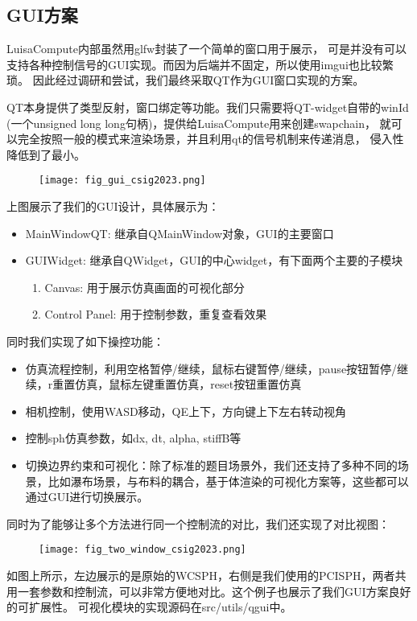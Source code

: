 \subsection{GUI方案}
LuisaCompute内部虽然用glfw封装了一个简单的窗口用于展示，
可是并没有可以支持各种控制信号的GUI实现。而因为后端并不固定，所以使用imgui也比较繁琐。
因此经过调研和尝试，我们最终采取QT作为GUI窗口实现的方案。

QT本身提供了类型反射，窗口绑定等功能。我们只需要将QT-widget自带的winId
(一个unsigned long long句柄)，提供给LuisaCompute用来创建swapchain，
就可以完全按照一般的模式来渲染场景，并且利用qt的信号机制来传递消息，
侵入性降低到了最小。

\begin{figure}[H]
	\centering
	\texttt{[image: fig\_gui\_csig2023.png]}
\end{figure}
上图展示了我们的GUI设计，具体展示为：
\begin{itemize}
	\item MainWindowQT: 继承自QMainWindow对象，GUI的主要窗口
	\item GUIWidget: 继承自QWidget，GUI的中心widget，有下面两个主要的子模块
	      \begin{enumerate}
		      \item Canvas: 用于展示仿真画面的可视化部分
		      \item Control Panel: 用于控制参数，重复查看效果
	      \end{enumerate}
\end{itemize}
同时我们实现了如下操控功能：
\begin{itemize}
	\item 仿真流程控制，利用空格暂停/继续，鼠标右键暂停/继续，pause按钮暂停/继续，r重置仿真，鼠标左键重置仿真，reset按钮重置仿真
	\item 相机控制，使用WASD移动，QE上下，方向键上下左右转动视角
	\item 控制sph仿真参数，如dx, dt, alpha, stiffB等
	\item 切换边界约束和可视化：除了标准的题目场景外，我们还支持了多种不同的场景，比如瀑布场景，与布料的耦合，基于体渲染的可视化方案等，这些都可以通过GUI进行切换展示。
\end{itemize}
同时为了能够让多个方法进行同一个控制流的对比，我们还实现了对比视图：
\begin{figure}[H]
	\centering
	\texttt{[image: fig\_two\_window\_csig2023.png]}
\end{figure}
如图上所示，左边展示的是原始的WCSPH，右侧是我们使用的PCISPH，两者共用一套参数和控制流，可以非常方便地对比。这个例子也展示了我们GUI方案良好的可扩展性。
可视化模块的实现源码在src/utils/qgui中。